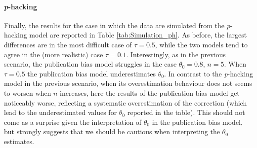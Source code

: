 \documentclass[preprint, authoryear]{elsarticle}
\theoremstyle{plain}
\theoremstyle{definition}
\begin{document}
\paragraph{\emph{p}-hacking} Finally, the results for the case in which the data are simulated from the \emph{p}-hacking model are reported in Table \ref{tab:Simulation_ph}. As before, the largest differences are in the most difficult case of $\tau = 0.5$, while the two models tend to agree in the (more realistic) case $\tau = 0.1$. Interestingly, as in the previous scenario, the publication bias model struggles in the case $\theta_0 = 0.8$, $n=5$. When $\tau = 0.5$ the publication bias model underestimates $\theta_0$. In contrast to the \emph{p}-hacking model in the previous scenario, when its overestimation behaviour does not seems to worsen when $n$ increases, here the results of the publication bias model get noticeably worse, reflecting a systematic overestimation of the correction (which lead to the underestimated values for $\theta_0$ reported in the table). This should not come as a surprise given the interpretation of $\theta_0$ in the publication bias model, but strongly suggests that we should be cautious when interpreting the $\theta_0$ estimates. 
\end{document}
